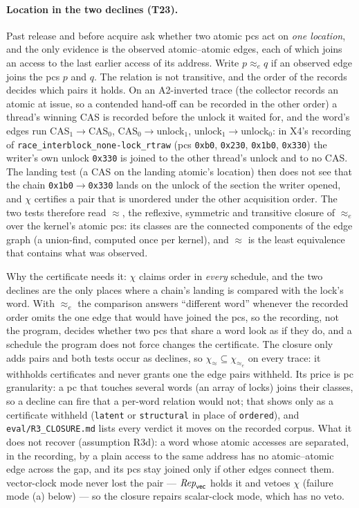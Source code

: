 \documentclass[11pt]{article}
\theoremstyle{remark}
\newcommand{\cls}[1]{\texttt{#1}}\newcommand{\M}{\mathsf{M}}
\begin{document}
\paragraph{Location in the two declines (T23).} Past release and before acquire ask whether two
atomic pcs act on \emph{one location}, and the only evidence is the observed atomic--atomic edges,
each of which joins an access to the last earlier access of its address. Write $p\approx_e q$ if
an observed edge joins the pcs $p$ and $q$. The relation is not transitive, and the order of the
records decides which pairs it holds. On an A2-inverted trace (the collector records an atomic at
issue, so a contended hand-off can be recorded in the other order) a thread's winning CAS is
recorded before the unlock it waited for, and the word's edges run
CAS$_1\to$CAS$_0$, CAS$_0\to$unlock$_1$, unlock$_1\to$unlock$_0$: in X4's recording of
\texttt{race\_interblock\_none-lock\_rtraw} (pcs \texttt{0xb0}, \texttt{0x230}, \texttt{0x1b0},
\texttt{0x330}) the writer's own unlock \texttt{0x330} is joined to the other thread's unlock and
to no CAS. The landing test (a CAS on the landing atomic's location) then does not see that the
chain \texttt{0x1b0}$\to$\texttt{0x330} lands on the unlock of the section the writer opened, and
$\chi$ certifies a pair that is unordered under the other acquisition order. The two tests
therefore read $\approx$, the reflexive, symmetric and transitive closure of $\approx_e$ over the
kernel's atomic pcs: its classes are the connected components of the edge graph (a union-find,
computed once per kernel), and $\approx$ is the least equivalence that contains what was observed.

Why the certificate needs it: $\chi$ claims order in \emph{every} schedule, and the two declines
are the only places where a chain's landing is compared with the lock's word. With $\approx_e$ the
comparison answers ``different word'' whenever the recorded order omits the one edge that would
have joined the pcs, so the recording, not the program, decides whether two pcs that share a word
look as if they do, and a schedule the program does not force changes the certificate. The
closure only adds pairs and both tests occur as declines, so
$\chi_{\approx}\subseteq\chi_{\approx_e}$ on every trace: it withholds certificates and never
grants one the edge pairs withheld. Its price is pc granularity: a pc that touches several words
(an array of locks) joins their classes, so a decline can fire that a per-word relation would
not; that shows only as a certificate withheld (\cls{latent} or \cls{structural} in place of
\cls{ordered}), and \texttt{eval/R3\_CLOSURE.md} lists every verdict it moves on the recorded
corpus. What it does not recover (assumption R3d): a word whose atomic accesses are separated, in
the recording, by a plain access to the same address has no atomic--atomic edge across the gap, and
its pcs stay joined only if other edges connect them. vector-clock mode never lost the pair ---
$\mathit{Rep}_{\mathsf{vec}}$ holds it and vetoes $\chi$ (failure mode (a) below) --- so the closure
repairs scalar-clock mode, which has no veto.
\end{document}
